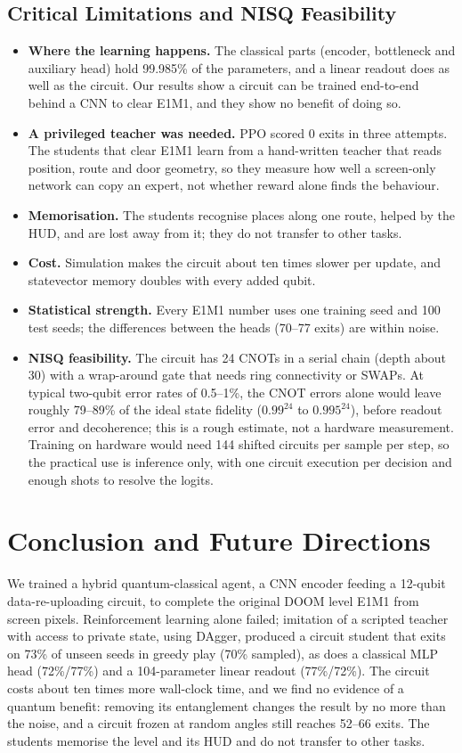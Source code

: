 \documentclass[10pt, a4paper]{article}
\begin{document}
\subsection{Critical Limitations and NISQ Feasibility}
\begin{itemize}
    \item \textbf{Where the learning happens.} The classical parts (encoder, bottleneck and auxiliary head) hold 99.985\% of the parameters, and a linear readout does as well as the circuit. Our results show a circuit can be trained end-to-end behind a CNN to clear E1M1, and they show no benefit of doing so.
    \item \textbf{A privileged teacher was needed.} PPO scored 0 exits in three attempts. The students that clear E1M1 learn from a hand-written teacher that reads position, route and door geometry, so they measure how well a screen-only network can copy an expert, not whether reward alone finds the behaviour.
    \item \textbf{Memorisation.} The students recognise places along one route, helped by the HUD, and are lost away from it; they do not transfer to other tasks.
    \item \textbf{Cost.} Simulation makes the circuit about ten times slower per update, and statevector memory doubles with every added qubit.
    \item \textbf{Statistical strength.} Every E1M1 number uses one training seed and 100 test seeds; the differences between the heads (70--77 exits) are within noise.
    \item \textbf{NISQ feasibility.} The circuit has 24 CNOTs in a serial chain (depth about 30) with a wrap-around gate that needs ring connectivity or SWAPs. At typical two-qubit error rates of 0.5--1\%, the CNOT errors alone would leave roughly 79--89\% of the ideal state fidelity ($0.99^{24}$ to $0.995^{24}$), before readout error and decoherence; this is a rough estimate, not a hardware measurement. Training on hardware would need 144 shifted circuits per sample per step, so the practical use is inference only, with one circuit execution per decision and enough shots to resolve the logits.
\end{itemize}

\section{Conclusion and Future Directions}
\label{sec:conclusion}
We trained a hybrid quantum-classical agent, a CNN encoder feeding a 12-qubit data-re-uploading circuit, to complete the original DOOM level E1M1 from screen pixels. Reinforcement learning alone failed; imitation of a scripted teacher with access to private state, using DAgger, produced a circuit student that exits on 73\% of unseen seeds in greedy play (70\% sampled), as does a classical MLP head (72\%/77\%) and a 104-parameter linear readout (77\%/72\%). The circuit costs about ten times more wall-clock time, and we find no evidence of a quantum benefit: removing its entanglement changes the result by no more than the noise, and a circuit frozen at random angles still reaches 52--66 exits. The students memorise the level and its HUD and do not transfer to other tasks.
\end{document}
